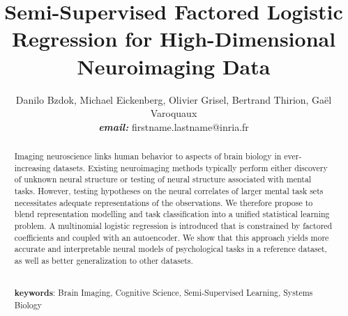 \documentclass{article} %
\title{Semi-Supervised Factored Logistic Regression for
High-Dimensional Neuroimaging Data}
\begin{document}
\author{Danilo Bzdok, Michael Eickenberg, Olivier Grisel,
  Bertrand Thirion,
  Ga\"el Varoquaux \\\textbf{\textit{email:} }firstname.lastname@inria.fr}

\maketitle

\begin{abstract}
Imaging neuroscience links human behavior to aspects of brain
biology in ever-increasing datasets.
%
Existing neuroimaging methods typically perform either discovery of unknown
neural structure or testing of neural structure associated with mental tasks.
%
However, testing hypotheses on the neural correlates of
larger mental task sets
necessitates adequate representations of the observations.
%
We therefore propose to blend
representation modelling and task classification into
a unified statistical learning problem.
%
A multinomial logistic regression is introduced that is
constrained by factored coefficients and coupled with an autoencoder.
%
We show that this approach yields more accurate and interpretable
neural models of psychological tasks in a reference dataset,
as well as better generalization to other datasets.
%


\textbf{\\keywords}: Brain Imaging, Cognitive Science, Semi-Supervised Learning, Systems Biology

\end{abstract}
\end{document}
